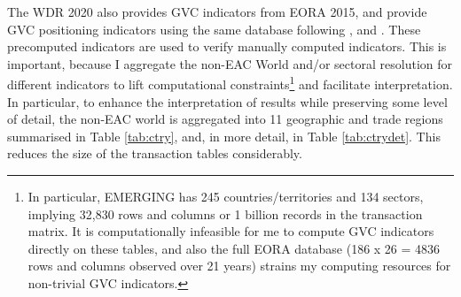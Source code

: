 \documentclass[a4paper]{article}
\begin{document}
The WDR 2020 \citep{world2020trading} also provides GVC indicators from EORA 2015, and \citet{mancini2023positioning} provide GVC positioning indicators using the same database following \citet{fally2012production}, \citet{antras2012measuring} and \citet{antras2013organizing, antras2018measurement}. These precomputed indicators are used to verify manually computed indicators. This is important, because I aggregate the non-EAC World and/or sectoral resolution for different indicators to lift computational constraints\footnote{In particular, EMERGING has 245 countries/territories and 134 sectors, implying 32,830 rows and columns or 1 billion records in the transaction matrix. It is computationally infeasible for me to compute GVC indicators directly on these tables, and also the full EORA database (186 x 26 = 4836 rows and columns observed over 21 years) strains my computing resources for non-trivial GVC indicators.} and facilitate interpretation. In particular,
to enhance the interpretation of results while preserving some level of detail, the non-EAC world is aggregated into 11 geographic and trade regions summarised in Table \ref{tab:ctry}, and, in more detail, in Table \ref{tab:ctrydet}. This reduces the size of the transaction tables considerably. %
\end{document}
